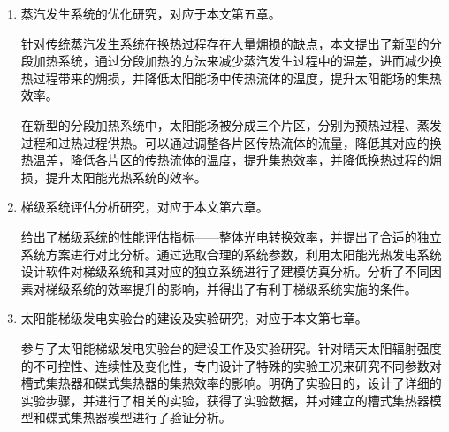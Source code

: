 \begin{enumerate}[label=(\arabic*)]
	\item 蒸汽发生系统的优化研究，对应于本文第五章。
	
	针对传统蒸汽发生系统在换热过程存在大量㶲损的缺点，本文提出了新型的分段加热系统，通过分段加热的方法来减少蒸汽发生过程中的温差，进而减少换热过程带来的㶲损，并降低太阳能场中传热流体的温度，提升太阳能场的集热效率。
	
	在新型的分段加热系统中，太阳能场被分成三个片区，分别为预热过程、蒸发过程和过热过程供热。可以通过调整各片区传热流体的流量，降低其对应的换热温差，降低各片区的传热流体的温度，提升集热效率，并降低换热过程的㶲损，提升太阳能光热系统的效率。

	\item 梯级系统评估分析研究，对应于本文第六章。
	
	给出了梯级系统的性能评估指标——整体光电转换效率，并提出了合适的独立系统方案进行对比分析。通过选取合理的系统参数，利用太阳能光热发电系统设计软件对梯级系统和其对应的独立系统进行了建模仿真分析。分析了不同因素对梯级系统的效率提升的影响，并得出了有利于梯级系统实施的条件。

	\item 太阳能梯级发电实验台的建设及实验研究，对应于本文第七章。
	
	参与了太阳能梯级发电实验台的建设工作及实验研究。针对晴天太阳辐射强度的不可控性、连续性及变化性，专门设计了特殊的实验工况来研究不同参数对槽式集热器和碟式集热器的集热效率的影响。明确了实验目的，设计了详细的实验步骤，并进行了相关的实验，获得了实验数据，并对建立的槽式集热器模型和碟式集热器模型进行了验证分析。
\end{enumerate}

